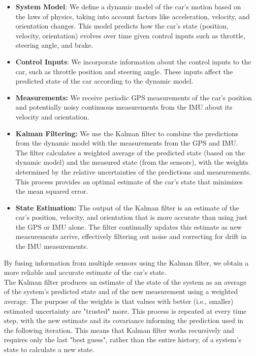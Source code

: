 \documentclass[12pt]{book}
\theoremstyle{definition}
\begin{document}
\begin{itemize}
    \item \textbf{System Model}: We define a dynamic model of the car's motion based on the laws of physics, taking into account factors like acceleration, velocity, and orientation changes. This model predicts how the car's state (position, velocity, orientation) evolves over time given control inputs such as throttle, steering angle, and brake.
    \item \textbf{Control Inputs}: We incorporate information about the control inputs to the car, such as throttle position and steering angle. These inputs affect the predicted state of the car according to the dynamic model.
    \item \textbf{Measurements:} We receive periodic GPS measurements of the car's position and potentially noisy continuous measurements from the IMU about its velocity and orientation.
    \item \textbf{Kalman Filtering:} We use the Kalman filter to combine the predictions from the dynamic model with the measurements from the GPS and IMU. The filter calculates a weighted average of the predicted state (based on the dynamic model) and the measured state (from the sensors), with the weights determined by the relative uncertainties of the predictions and measurements. This process provides an optimal estimate of the car's state that minimizes the mean squared error.
    \item \textbf{State Estimation:} The output of the Kalman filter is an estimate of the car's position, velocity, and orientation that is more accurate than using just the GPS or IMU alone. The filter continually updates this estimate as new measurements arrive, effectively filtering out noise and correcting for drift in the IMU measurements.
\end{itemize}


By fusing information from multiple sensors using the Kalman filter, we obtain a more reliable and accurate estimate of the car's state.\\

The Kalman filter produces an estimate of the state of the system as an average of the system's predicted state and of the new measurement using a weighted average. The purpose of the weights is that values with better (i.e., smaller) estimated uncertainty are "trusted" more. This process is repeated at every time step, with the new estimate and its covariance informing the prediction used in the following iteration. This means that Kalman filter works recursively and requires only the last "best guess", rather than the entire history, of a system's state to calculate a new state.\\
\end{document}
